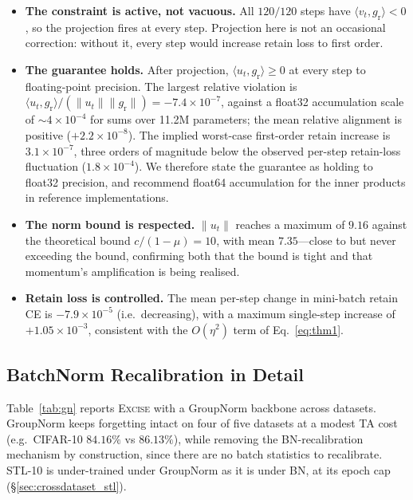 \documentclass{article}
\newcommand{\ours}{\textsc{Excise}}
\newcommand{\gr}{g_{\mathrm{r}}}
\newcommand{\rev}[1]{{\color{revisedB}#1}}
\theoremstyle{remark}
\theoremstyle{plain}
\begin{document}
\begin{itemize}
\item \textbf{The constraint is active, not vacuous.} All $120/120$ steps have
$\langle v_t,\gr\rangle < 0$, so the projection fires at every step. Projection
here is not an occasional correction: without it, every step would increase
retain loss to first order.
\item \textbf{The guarantee holds.} After projection,
$\langle u_t,\gr\rangle \ge 0$ at every step to floating-point precision. The
largest relative violation is
$\langle u_t,\gr\rangle/(\|u_t\|\|\gr\|) = -7.4\times 10^{-7}$, against a
float32 accumulation scale of ${\sim}4\times 10^{-4}$ for sums over 11.2M
parameters; the mean relative alignment is positive
($+2.2\times 10^{-8}$). The implied worst-case first-order retain increase is
$3.1\times 10^{-7}$, three orders of magnitude below the observed per-step
retain-loss fluctuation ($1.8\times 10^{-4}$). We therefore state the guarantee
as holding to float32 precision, and recommend float64 accumulation for the
inner products in reference implementations.
\item \textbf{The norm bound is respected.} $\|u_t\|$ reaches a maximum of
$9.16$ against the theoretical bound $c/(1-\mu)=10$, with mean $7.35$---close to
but never exceeding the bound, confirming both that the bound is tight and that
momentum's amplification is being realised.
\item \textbf{Retain loss is controlled.} The mean per-step change in mini-batch
retain CE is $-7.9\times 10^{-5}$ (i.e.\ decreasing), with a maximum single-step
increase of $+1.05\times 10^{-3}$, consistent with the $O(\eta^2)$ term of
Eq.~\ref{eq:thm1}.
\end{itemize}

\subsection{BatchNorm Recalibration in Detail}\label{app:bn}

Table~\ref{tab:gn} reports \ours{} with a GroupNorm backbone across datasets.
GroupNorm keeps forgetting intact on four of five datasets at a modest TA cost
(e.g.\ CIFAR-10 $84.16\%$ vs $86.13\%$), while removing the BN-recalibration
mechanism by construction, since there are no batch statistics to recalibrate.
STL-10 is under-trained under GroupNorm as it is under BN, at \rev{its epoch cap}
(\S\ref{sec:crossdataset_stl}).
\end{document}
